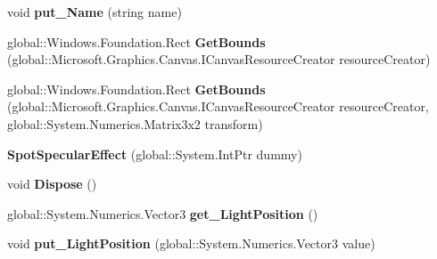 \begin{DoxyCompactItemize}
void {\bfseries put\+\_\+\+Name} (string name)
\item 
\mbox{\label{class_microsoft_1_1_graphics_1_1_canvas_1_1_effects_1_1_spot_specular_effect_af612f6134e91b1ed5295b3aa6fa0540f}} 
global\+::\+Windows.\+Foundation.\+Rect {\bfseries Get\+Bounds} (global\+::\+Microsoft.\+Graphics.\+Canvas.\+I\+Canvas\+Resource\+Creator resource\+Creator)
\item 
\mbox{\label{class_microsoft_1_1_graphics_1_1_canvas_1_1_effects_1_1_spot_specular_effect_a7c7e4f980041eb6d4241d77645cd359a}} 
global\+::\+Windows.\+Foundation.\+Rect {\bfseries Get\+Bounds} (global\+::\+Microsoft.\+Graphics.\+Canvas.\+I\+Canvas\+Resource\+Creator resource\+Creator, global\+::\+System.\+Numerics.\+Matrix3x2 transform)
\item 
\mbox{\label{class_microsoft_1_1_graphics_1_1_canvas_1_1_effects_1_1_spot_specular_effect_ad8ff784c45c090ff7b56ad390b96a1e8}} 
{\bfseries Spot\+Specular\+Effect} (global\+::\+System.\+Int\+Ptr dummy)
\item 
\mbox{\label{class_microsoft_1_1_graphics_1_1_canvas_1_1_effects_1_1_spot_specular_effect_a5ea83a8e811b1574f47c959ac2efc5d5}} 
void {\bfseries Dispose} ()
\item 
\mbox{\label{class_microsoft_1_1_graphics_1_1_canvas_1_1_effects_1_1_spot_specular_effect_aaedc555070dd57d7e182df16376bb184}} 
global\+::\+System.\+Numerics.\+Vector3 {\bfseries get\+\_\+\+Light\+Position} ()
\item 
\mbox{\label{class_microsoft_1_1_graphics_1_1_canvas_1_1_effects_1_1_spot_specular_effect_af351b5696f84ff10d55958304b841b3b}} 
void {\bfseries put\+\_\+\+Light\+Position} (global\+::\+System.\+Numerics.\+Vector3 value)
\item 
\mbox{\label{class_microsoft_1_1_graphics_1_1_canvas_1_1_effects_1_1_spot_specular_effect_a1a8fb920836a90f05304434382626468}} 

\end{DoxyCompactItemize}
